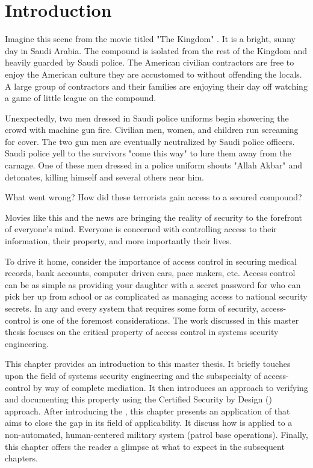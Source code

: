 \documentclass[../../main/main.tex]{subfiles}
\begin{document}
\glsresetall

\chapter{Introduction}
 Imagine this scene from the movie titled "The Kingdom" \cite{kingdom}.  It is a bright, sunny day in Saudi Arabia.  The compound is isolated from the rest of the Kingdom and heavily guarded by Saudi police.  The American civilian contractors are free to enjoy the American culture they are accustomed to without offending the locals.  A large group of contractors and their families are enjoying their day off watching a game of little league on the compound.  
 
 
Unexpectedly, two men dressed in Saudi police uniforms begin showering the crowd with machine gun fire.   Civilian men, women, and children run screaming for cover. The two gun men are eventually neutralized by Saudi police officers.  Saudi police yell to the survivors "come this way" to lure them away from the carnage. One of these men dressed in a police uniform shouts "Allah Akbar" and detonates, killing himself and several others near him. 

What went wrong?  How did these terrorists gain access to a secured compound?  

Movies like this and the news are bringing the reality of security to the forefront of everyone's mind.   Everyone is concerned with controlling access to their information, their property, and more importantly their lives.   

To drive it home, consider the importance of access control in securing medical records, bank accounts, computer driven cars, pace makers, etc.  Access control can be as simple as providing your daughter with a secret password for who can pick her up from school or as complicated as managing access to national security secrets.  In any and every system that requires some form of security, access-control is one of the foremost considerations. The work discussed in this master thesis focuses on the critical property of access control in systems security engineering.

This chapter provides an introduction to this master thesis.  It briefly touches upon the field of systems security engineering and the subspecialty of access-control by way of complete mediation.  It then introduces an approach to verifying and documenting this property using the Certified Security by Design () approach.  After introducing the , this chapter presents an application of  that aims to close the gap in its field of applicability.  It discuss how  is applied to a non-automated, human-centered military system (patrol base operations).  Finally, this chapter offers the reader a glimpse at what to expect in the subsequent chapters.
\end{document}
